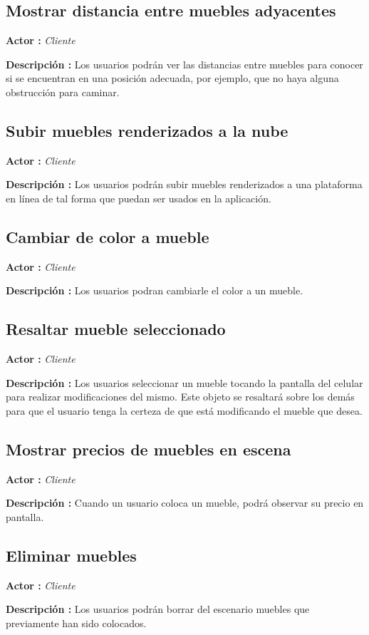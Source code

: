 \subsection{Mostrar distancia entre muebles adyacentes}
\textbf{Actor :} \textit{Cliente} \par
\textbf{Descripción :}  Los usuarios podrán ver las distancias entre muebles para conocer si se encuentran en una posición adecuada, por ejemplo, que no haya alguna obstrucción para caminar.

\subsection{Subir muebles renderizados a la nube}
\textbf{Actor :} \textit{Cliente} \par
\textbf{Descripción :}  Los usuarios podrán subir muebles renderizados a una plataforma en línea de tal forma que puedan ser usados en la aplicación.

\subsection{Cambiar de color a mueble}
\textbf{Actor :} \textit{Cliente} \par
\textbf{Descripción :} Los usuarios podran cambiarle el color a un mueble.

\subsection{Resaltar mueble seleccionado}
\textbf{Actor :} \textit{Cliente} \par
\textbf{Descripción :} Los usuarios seleccionar un mueble tocando la pantalla del celular para realizar modificaciones del mismo. Este objeto se resaltará sobre los demás para que el usuario tenga la certeza de que está modificando el mueble que desea.

\subsection{Mostrar precios de muebles en escena}
\textbf{Actor :} \textit{Cliente} \par
\textbf{Descripción :} Cuando un usuario coloca un mueble, podrá observar su precio en pantalla.

\subsection{Eliminar muebles}
\textbf{Actor :} \textit{Cliente} \par
\textbf{Descripción :} Los usuarios podrán borrar del escenario muebles que previamente han sido colocados. 
